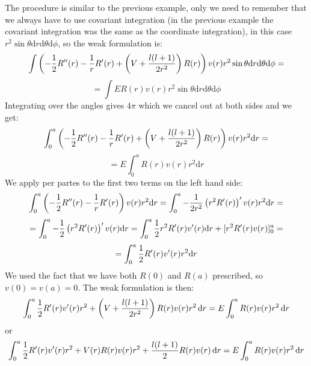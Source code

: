 \documentclass[12pt]{article}
\def\d{\mbox{d}}
\begin{document}
The procedure is similar to the previous example, only we need to remember that
we always have to use covariant integration (in the previous example the
covariant integration was the same as the coordinate integration),
in this case $r^2\sin\theta \d
r\d\theta\d\phi$, so the weak formulation is:
$$\int \left(-{1\over2}R''(r)-{1\over
r}R'(r)+\left(V+{l(l+1)\over2r^2}\right)R(r)\right)v(r)r^2\sin\theta \d
r\d\theta\d\phi=$$
$$
=\int ER(r) v(r)r^2\sin\theta \d r\d\theta\d\phi$$
Integrating over the angles gives $4\pi$ which we cancel out at both sides and
we get:
$$\int_0^a \left(-{1\over2}R''(r)-{1\over
r}R'(r)+\left(V+{l(l+1)\over2r^2}\right)R(r)\right)v(r)r^2 \d r=$$
$$
=E\int_0^a R(r) v(r)r^2 \d r$$
We apply per partes to the first two terms on the left hand side:
$$\int_0^a \left(-{1\over2}R''(r)-{1\over r}R'(r)\right)v(r)r^2 \d r
=\int_0^a -{1\over2r^2}\left(r^2 R'(r)\right)'v(r)r^2 \d r=
$$
$$
=\int_0^a -{1\over2}\left(r^2 R'(r)\right)'v(r) \d r
=\int_0^a {1\over2}r^2 R'(r)v'(r) \d r+[r^2R'(r)v(r)]_0^a=
$$
$$
=\int_0^a {1\over2} R'(r)v'(r) r^2\d r
$$
We used the fact that we have both $R(0)$ and $R(a)$ prescribed, so
$v(0)=v(a)=0$. The weak formulation is then:
$$\int_0^a {1\over2}R'(r)v'(r)r^2+
\left(V+{l(l+1)\over2r^2}\right)R(r)v(r)r^2\,\d r
=
E\int_0^aR(r)v(r)r^2\,\d r
$$
or
$$\int_0^a {1\over2}R'(r)v'(r)r^2+
V(r)R(r)v(r)r^2+{l(l+1)\over2} R(r)v(r)\,\d r
=
E\int_0^aR(r)v(r)r^2\,\d r
$$
\end{document}
